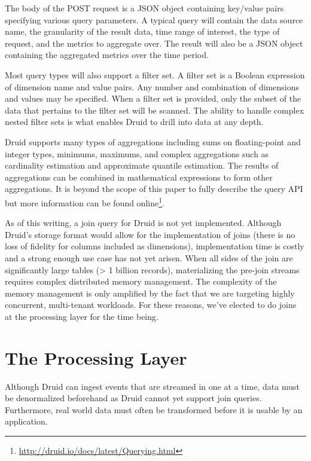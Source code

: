 \documentclass{vldb}
\begin{document}
The body of the POST request is a JSON object containing key/value pairs
specifying various query parameters. A typical query will contain the data
source name, the granularity of the result data, time range of interest, the
type of request, and the metrics to aggregate over. The result will also be a
JSON object containing the aggregated metrics over the time period. 

Most query types will also support a filter set. A filter set is a Boolean
expression of dimension name and value pairs. Any number and combination of
dimensions and values may be specified. When a filter set is provided, only the
subset of the data that pertains to the filter set will be scanned. The ability
to handle complex nested filter sets is what enables Druid to drill into data
at any depth. 

Druid supports many types of aggregations including sums on floating-point and
integer types, minimums, maximums, and complex aggregations such as cardinality
estimation and approximate quantile estimation. The results of aggregations can
be combined in mathematical expressions to form other aggregations. It is
beyond the scope of this paper to fully describe the query API but more
information can be found
online\footnote{\href{http://druid.io/docs/latest/Querying.html}{http://druid.io/docs/latest/Querying.html}}. 

As of this writing, a join query for Druid is not yet implemented.  Although
Druid’s storage format would allow for the implementation of joins (there is no
loss of fidelity for columns included as dimensions), implementation time is
costly and a strong enough use case has not yet arisen. When all sides of the
join are significantly large tables (> 1 billion records), materializing the
pre-join streams requires complex distributed memory management. The complexity
of the memory management is only amplified by the fact that we are targeting
highly concurrent, multi-tenant workloads. For these reasons, we’ve elected to
do joins at the processing layer for the time being.

\section{The Processing Layer}
\label{sec:processing}
Although Druid can ingest events that are streamed in one at a time, data must
be denormalized beforehand as Druid cannot yet support
join queries. Furthermore, real world data must often be transformed before it
is usable by an application.
\end{document}
